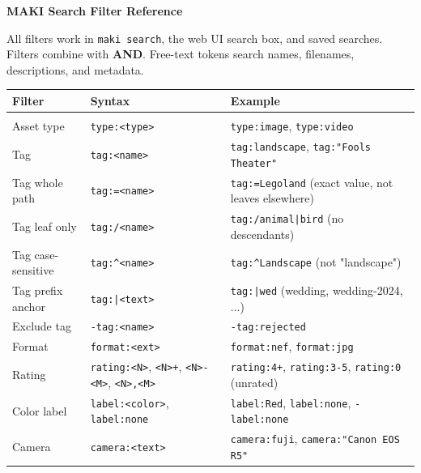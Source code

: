 \documentclass[a4paper,10pt]{extarticle}
\newcommand{\cmd}[1]{\texttt{#1}}
\begin{document}

\begin{center}
{\Large\bfseries\color{maki-salmon} MAKI Search Filter Reference}
\end{center}
\vspace{2pt}

All filters work in \cmd{maki search}, the web UI search box, and saved searches.
Filters combine with \textbf{AND}. Free-text tokens search names, filenames, descriptions, and metadata.

\vspace{6pt}

\renewcommand{\arraystretch}{1.1}
\small
\begin{tabularx}{\textwidth}{@{}l l X@{}}
\textbf{Filter} & \textbf{Syntax} & \textbf{Example} \\[2pt]
\hline\\[-6pt]
Asset type          & \cmd{type:<type>}                     & \cmd{type:image}, \cmd{type:video} \\
Tag                 & \cmd{tag:<name>}                      & \cmd{tag:landscape}, \cmd{tag:"Fools Theater"} \\
Tag whole path      & \cmd{tag:=<name>}                     & \cmd{tag:=Legoland} (exact value, not leaves elsewhere) \\
Tag leaf only       & \cmd{tag:/<name>}                     & \cmd{tag:/animal|bird} (no descendants) \\
Tag case-sensitive  & \cmd{tag:\textasciicircum<name>}      & \cmd{tag:\textasciicircum Landscape} (not "landscape") \\
Tag prefix anchor   & \cmd{tag:|<text>}                     & \cmd{tag:|wed} (wedding, wedding-2024, ...) \\
Exclude tag         & \cmd{-tag:<name>}                     & \cmd{-tag:rejected} \\
Format              & \cmd{format:<ext>}                    & \cmd{format:nef}, \cmd{format:jpg} \\
Rating              & \cmd{rating:<N>}, \cmd{<N>+}, \cmd{<N>-<M>}, \cmd{<N>,<M>} & \cmd{rating:4+}, \cmd{rating:3-5}, \cmd{rating:0} (unrated) \\
Color label         & \cmd{label:<color>}, \cmd{label:none}  & \cmd{label:Red}, \cmd{label:none}, \cmd{-label:none} \\
Camera              & \cmd{camera:<text>}                   & \cmd{camera:fuji}, \cmd{camera:"Canon EOS R5"} \\

\end{tabularx}
\end{document}
